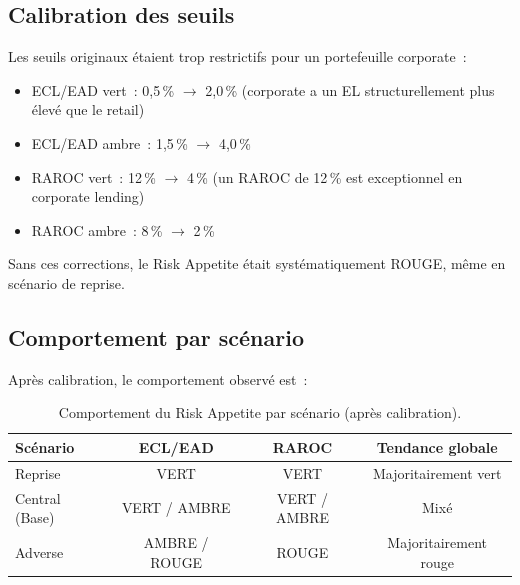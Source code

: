 \documentclass[12pt,a4paper]{article}
\begin{document}
\subsection{Calibration des seuils}

\begin{warningbox}
Les seuils originaux \'etaient trop restrictifs pour un portefeuille corporate~:
\begin{itemize}[nosep]
    \item ECL/EAD vert~: 0{,}5\,\% $\rightarrow$ 2{,}0\,\% (corporate a un EL structurellement plus \'elev\'e que le retail)
    \item ECL/EAD ambre~: 1{,}5\,\% $\rightarrow$ 4{,}0\,\%
    \item RAROC vert~: 12\,\% $\rightarrow$ 4\,\% (un RAROC de 12\,\% est exceptionnel en corporate lending)
    \item RAROC ambre~: 8\,\% $\rightarrow$ 2\,\%
\end{itemize}
Sans ces corrections, le Risk Appetite \'etait syst\'ematiquement ROUGE, m\^eme en sc\'enario de reprise.
\end{warningbox}

\subsection{Comportement par sc\'enario}

Apr\`es calibration, le comportement observ\'e est~:

\begin{table}[h]
\centering
\begin{tabular}{lccc}
\toprule
\textbf{Sc\'enario} & \textbf{ECL/EAD} & \textbf{RAROC} & \textbf{Tendance globale} \\
\midrule
Reprise & \textcolor{accentgreen}{VERT} & \textcolor{accentgreen}{VERT} & Majoritairement vert \\
Central (Base) & \textcolor{accentgreen}{VERT} / \textcolor{accentorange}{AMBRE} & \textcolor{accentgreen}{VERT} / \textcolor{accentorange}{AMBRE} & Mix\'e \\
Adverse & \textcolor{accentorange}{AMBRE} / \textcolor{accentred}{ROUGE} & \textcolor{accentred}{ROUGE} & Majoritairement rouge \\
\bottomrule
\end{tabular}
\caption{Comportement du Risk Appetite par sc\'enario (apr\`es calibration).}
\label{tab:risk_appetite_behavior}
\end{table}
\end{document}
